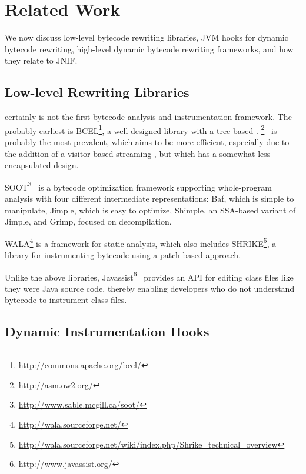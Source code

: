 \section{Related Work}\label{sec:jnif-relatedwork}

We now discuss low-level \java{} bytecode rewriting libraries,
JVM hooks for dynamic bytecode rewriting,
high-level dynamic bytecode rewriting frameworks,
and how they relate to JNIF.
 
\subsection*{Low-level Rewriting Libraries}

\jnif{} certainly is not the first \java{} bytecode analysis and instrumentation framework.
The probably earliest is BCEL\footnote{\url{http://commons.apache.org/bcel/}},
a well-designed \java{} library with a tree-based \api{}.
\asm{}\footnote{\url{http://asm.ow2.org/}}~\citep{brunetonASMCodeManipulation2002,kuleshovUsingASMFramework2007}
is probably the most prevalent,
which aims to be more efficient, especially due to the addition of a visitor-based streaming \api{}, 
but which has a somewhat less encapsulated design.

SOOT\footnote{\url{http://www.sable.mcgill.ca/soot/}}~\citep{vallee-raiSootJavaBytecode1999}
is a \java{} bytecode optimization framework supporting whole-program analysis
with four different intermediate representations:
Baf, which is simple to manipulate,
Jimple, which is easy to optimize, 
Shimple, an SSA-based variant of Jimple, and
Grimp, focused on decompilation. 

WALA\footnote{\url{http://wala.sourceforge.net/}} is a framework for static analysis, 
which also includes SHRIKE\footnote{\url{http://wala.sourceforge.net/wiki/index.php/Shrike_technical_overview}}, 
a library for instrumenting bytecode using a patch-based approach.

Unlike the above libraries, 
Javassist\footnote{\url{http://www.javassist.org/}}~\citep{chibaEasytoUseToolkitEfficient2003}
provides an API for editing class files like they were Java source code,
thereby enabling developers who do not understand bytecode to instrument class files.

\subsection*{Dynamic Instrumentation Hooks}

